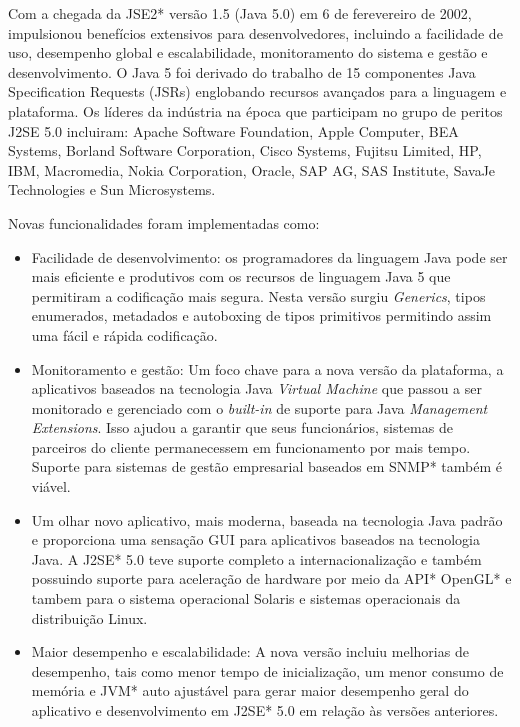 Com a chegada da JSE2* versão 1.5 (Java 5.0) em 6 de ferevereiro de 2002, impulsionou benefícios extensivos para desenvolvedores, incluindo a facilidade de uso, desempenho global e escalabilidade, monitoramento do sistema e gestão e desenvolvimento. O Java 5 foi derivado do trabalho de 15 componentes Java Specification Requests (JSRs) englobando recursos avançados para a linguagem e plataforma. Os líderes da indústria na época que participam no grupo de peritos J2SE 5.0 incluiram: Apache Software Foundation, Apple Computer, BEA Systems, Borland Software Corporation, Cisco Systems, Fujitsu Limited, HP, IBM, Macromedia, Nokia Corporation, Oracle, SAP AG, SAS Institute, SavaJe Technologies e Sun Microsystems.

Novas funcionalidades foram implementadas como:

\begin{itemize}
  \item Facilidade de desenvolvimento: os programadores da linguagem Java pode ser mais eficiente e produtivos com os recursos de linguagem Java 5 que permitiram a codificação mais segura. Nesta versão surgiu {\it Generics}, tipos enumerados, metadados e autoboxing de tipos primitivos permitindo assim uma fácil e rápida codificação.
  \item Monitoramento e gestão: Um foco chave para a nova versão da plataforma, a aplicativos baseados na tecnologia Java {\it Virtual Machine} que passou a ser monitorado e gerenciado com o {\it built-in} de suporte para Java {\it Management Extensions}. Isso ajudou a garantir que seus funcionários, sistemas de parceiros do cliente permanecessem em funcionamento por mais tempo. Suporte para sistemas de gestão empresarial baseados em SNMP* também é viável.
  \item Um olhar novo aplicativo, mais moderna, baseada na tecnologia Java padrão e proporciona uma sensação GUI para aplicativos baseados na tecnologia Java. A J2SE* 5.0 teve suporte completo a internacionalização e também possuindo suporte para aceleração de hardware por meio da API* OpenGL* e tambem para o sistema operacional Solaris e sistemas operacionais da distribuição Linux.
  \item Maior desempenho e escalabilidade: A nova versão incluiu melhorias de desempenho, tais como menor tempo de inicialização, um menor consumo de memória e JVM* auto ajustável para gerar maior desempenho geral do aplicativo e desenvolvimento em J2SE* 5.0 em relação às versões anteriores.\\
\end{itemize}

